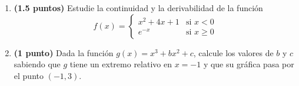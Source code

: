 
\begin{enumerate}[label=\alph*),leftmargin=2.4em]
  \item \textbf{(1.5 puntos)} Estudie la continuidad y la derivabilidad de la función
  \[
  f(x)=\begin{cases}
    x^2+4x+1&\text{si }x<0\\
    e^{-x}&\text{si }x\geq 0
  \end{cases}
  \]
  \item \textbf{(1 punto)} Dada la función \(g(x)=x^3+bx^2+c\), calcule los valores de \(b\) y \(c\) sabiendo que \(g\) tiene un extremo relativo en \(x=-1\) y que su gráfica pasa por el punto \((-1,3)\).
\end{enumerate}
